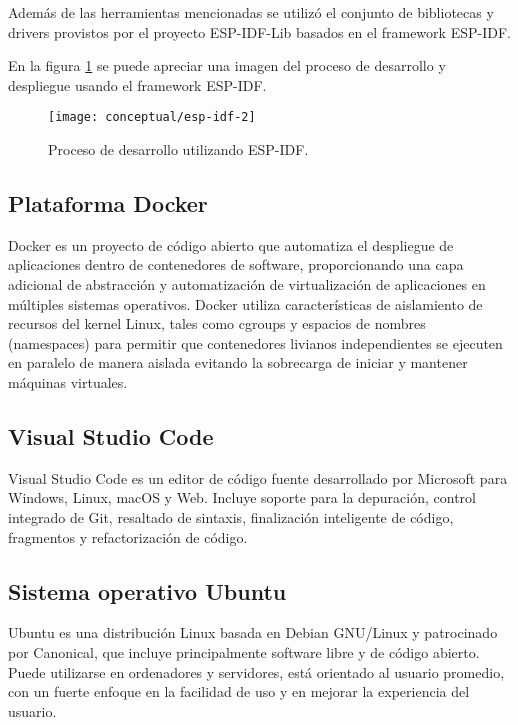 Además de las herramientas mencionadas se utilizó el conjunto de bibliotecas y drivers provistos por el proyecto ESP-IDF-Lib \cite{esp_idf_lib_website} basados en el framework ESP-IDF.

En la figura \ref{fig:esp-idf} se puede apreciar una imagen del proceso de desarrollo y despliegue usando el framework ESP-IDF.

\begin{figure}[h]
    \centering
    \texttt{[image: conceptual/esp-idf-2]}
    \caption{Proceso de desarrollo utilizando ESP-IDF\protect\footnotemark.}
    \label{fig:esp-idf}
\end{figure}


\subsection{Plataforma Docker}

Docker \cite{docker_website} es un proyecto de código abierto que automatiza el despliegue de aplicaciones dentro de contenedores de software, proporcionando una capa adicional de abstracción y automatización de virtualización de aplicaciones en múltiples sistemas operativos. Docker utiliza características de aislamiento de recursos del kernel Linux, tales como cgroups y espacios de nombres (namespaces) para permitir que contenedores livianos independientes se ejecuten en paralelo de manera aislada evitando la sobrecarga de iniciar y mantener máquinas virtuales.

\subsection{Visual Studio Code}

Visual Studio Code \cite{vscode_website} es un editor de código fuente desarrollado por Microsoft para Windows, Linux, macOS y Web. Incluye soporte para la depuración, control integrado de Git, resaltado de sintaxis, finalización inteligente de código, fragmentos y refactorización de código. 


\subsection{Sistema operativo Ubuntu}
Ubuntu \cite{ubuntu_website} es una distribución Linux basada en Debian GNU/Linux y patrocinado por Canonical, que incluye principalmente software libre y de código abierto. Puede utilizarse en ordenadores y servidores, está orientado al usuario promedio, con un fuerte enfoque en la facilidad de uso y en mejorar la experiencia del usuario. 

